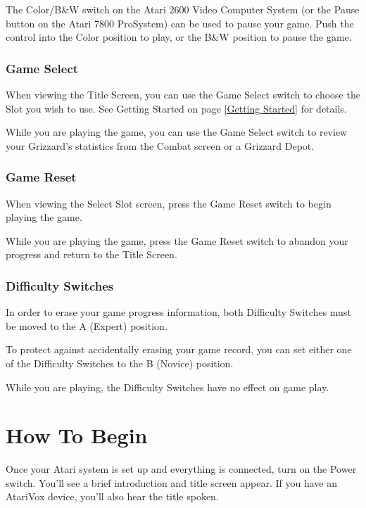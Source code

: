 \documentclass[12pt,twoside]{memoir}
\begin{document}
The Color/B\&W  switch on the Atari  2600 Video Computer System  (or the
Pause button  on the  Atari 7800  ProSystem) can be  used to  pause your
game. Push  the control  into the  Color position to  play, or  the B\&W
position to pause the game.

\subsection{Game Select}

When viewing  the Title Screen,  you can use  the Game Select  switch to
choose  the  Slot  you  wish  to   use.  See  Getting  Started  on  page
\ref{Getting Started} for details.

While you are  playing the game, you  can use the Game  Select switch to
review   your  Grizzard's   statistics   from  the   Combat  screen   or
a Grizzard Depot.

\subsection{Game Reset}

When viewing  the Select  Slot screen,  press the  Game Reset  switch to
begin playing the game.

While you are  playing the game, press the Game  Reset switch to abandon
your progress and return to the Title Screen.

\subsection{Difficulty Switches}

In  order  to erase  your  game  progress information,  both  Difficulty
Switches must be moved to the A (Expert) position.

To protect  against accidentally erasing  your game record, you  can set
either one of the Difficulty Switches to the B (Novice) position.

While  you  are playing,  the  Difficulty  Switches  have no  effect  on
game play.

\chapter{How To Begin}\label{How To Begin}

Once your  Atari system is set  up and everything is  connected, turn on
the  Power switch.  You'll see  a  brief introduction  and title  screen
appear.  If  you   have  an  AtariVox  device,  you'll   also  hear  the
title spoken.
\end{document}
